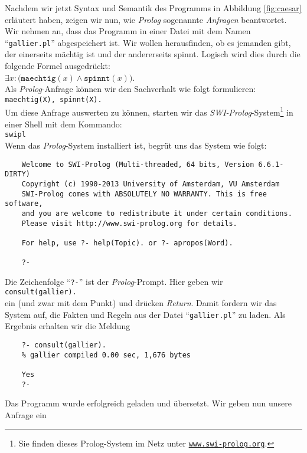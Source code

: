 Nachdem wir jetzt Syntax und Semantik des Programms in Abbildung \ref{fig:caesar}
erl\"{a}utert haben, zeigen wir nun, wie \textsl{Prolog} sogenannte \emph{Anfragen}
beantwortet. Wir nehmen an, dass das Programm in einer Datei mit dem Namen
``\texttt{gallier.pl}'' abgespeichert ist.  Wir wollen herausfinden, ob es jemanden gibt,
der einerseits m\"{a}chtig ist und der andererseits spinnt.  Logisch wird dies durch die
folgende Formel ausgedr\"{u}ckt: \\[0.2cm]
\hspace*{1.3cm} $\exists x \colon \bigl(\texttt{maechtig}(x) \wedge \texttt{spinnt}(x)\bigr)$. \\[0.2cm]
Als \textsl{Prolog}-Anfrage k\"{o}nnen wir den Sachverhalt wie folgt formulieren: \\[0.2cm]
\hspace*{1.3cm} \texttt{maechtig(X), spinnt(X).} \\[0.2cm]
Um diese Anfrage auswerten zu k\"{o}nnen, starten wir das \textsl{SWI-Prolog}-System\footnote{
Sie finden dieses Prolog-System im Netz unter \href{http://www.swi-prolog.org}{\texttt{www.swi-prolog.org}}.}
in einer Shell mit dem Kommando: \\[0.2cm]
\hspace*{1.3cm} \texttt{swipl}\\[0.2cm]
Wenn das \textsl{Prolog}-System installiert ist, begr\"{u}\3t uns das System wie folgt:
\begin{verbatim}
    Welcome to SWI-Prolog (Multi-threaded, 64 bits, Version 6.6.1-DIRTY)
    Copyright (c) 1990-2013 University of Amsterdam, VU Amsterdam
    SWI-Prolog comes with ABSOLUTELY NO WARRANTY. This is free software,
    and you are welcome to redistribute it under certain conditions.
    Please visit http://www.swi-prolog.org for details.
    
    For help, use ?- help(Topic). or ?- apropos(Word).
    
    ?- 
\end{verbatim}
Die Zeichenfolge ``\texttt{?-}'' ist der \textsl{Prolog}-Prompt.  Hier geben wir  \\[0.2cm]
\hspace*{1.3cm} \texttt{consult(gallier).} \\[0.2cm]
ein (und zwar mit dem Punkt) und dr\"{u}cken \textsl{Return}. Damit fordern wir das System auf, die
Fakten und Regeln aus der Datei ``\texttt{gallier.pl}'' zu laden.  Als Ergebnis erhalten
wir die Meldung
\begin{verbatim}
    ?- consult(gallier).
    % gallier compiled 0.00 sec, 1,676 bytes
    
    Yes
    ?- 
\end{verbatim}
Das Programm wurde erfolgreich geladen und \"{u}bersetzt.  Wir geben nun unsere Anfrage ein

